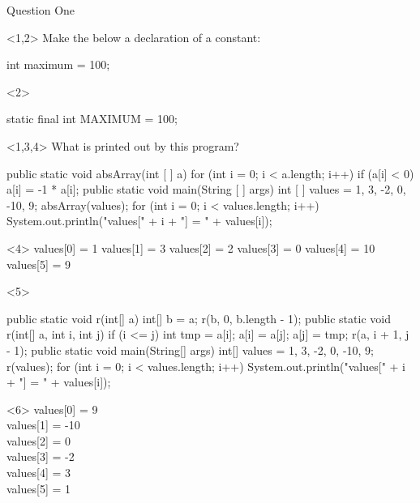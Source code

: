 \begin{frame}[t, fragile]{Question One} \vspace{4pt}

\begin{onlyenv}<1,2>
Make the below a declaration of a constant:

\begin{java}
int maximum = 100;
\end{java}
\end{onlyenv}

\begin{onlyenv}<2>

\begin{java}
static final int MAXIMUM = 100;
\end{java}

\end{onlyenv}

\begin{onlyenv}<1,3,4>
What is printed out by this program?

\begin{java}
public static void absArray(int [ ] a) {
	for (int i = 0; i < a.length; i++)
		if (a[i] < 0)
			a[i] = -1 * a[i];
	}
public static void main(String [ ] args) {
	int [ ] values = {1, 3, -2, 0, -10, 9};
	absArray(values);
	for (int i = 0; i < values.length; i++)
		System.out.println("values[" + i + "] = " + values[i]);
}
\end{java}
\end{onlyenv}

\begin{onlyenv}<4>
values[0] = 1
values[1] = 3
values[2] = 2
values[3] = 0
values[4] = 10
values[5] = 9
\end{onlyenv}

\begin{onlyenv}<5>
\begin{java}
public static void r(int[] a) {
	int[] b = a;
	r(b, 0, b.length - 1);
}
public static void r(int[] a, int i, int j) {
	if (i <= j) {
		int tmp = a[i];
		a[i] = a[j];
		a[j] = tmp;
		r(a, i + 1, j - 1);
	}
}
public static void main(String[] args) {
	int[] values = {1, 3, -2, 0, -10, 9};
	r(values);
	for (int i = 0; i < values.length; i++)
		System.out.println("values[" + i + "] = " + values[i]);
}
\end{java}
\end{onlyenv}

\begin{onlyenv}<6>
values[0] = 9\\
values[1] = -10\\
values[2] = 0\\
values[3] = -2\\
values[4] = 3\\
values[5] = 1
\end{onlyenv}

\end{frame}

